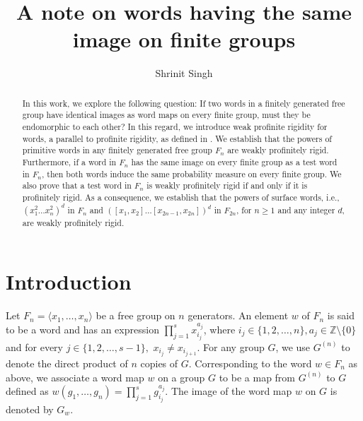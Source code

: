 \documentclass[12pt]{amsart}
\def \Z {{\mathbb{Z}}}
\begin{document}
\title{A note on words having the same image on finite groups}



\author{Shrinit Singh}
\address{Department of Mathematics, Shiv Nadar Institution of Eminence, Greater Noida, Dadri-201314, India }

 



\begin{abstract}
In this work, we explore the following question: If two words in a finitely generated free group have identical images as word maps on every finite group, must they be endomorphic to each other? In this regard, we introduce weak profinite rigidity for words, a parallel to profinite rigidity, as defined in \cite{hanany2020some}. We establish that the powers of primitive words in any finitely generated free group $F_n$ are weakly profinitely rigid. Furthermore, if a word in $F_n$ has the same image on every finite group as a test word in $F_n$, then both words induce the same probability measure on every finite group. We also prove that a test word in $F_n$ is weakly profinitely rigid if and only if it is profinitely rigid. As a consequence, we establish that the powers of surface words, i.e., $(x_1^2\ldots x_n^2)^d$ in $F_n$ and $([x_1,x_2]\ldots [x_{2n-1},x_{2n}])^d$ in $F_{2n}$, for $n \geq 1$ and any integer $d$, are weakly profinitely rigid.


\end{abstract}
\maketitle


\section{Introduction}

Let $F_n = \langle x_1, \ldots, x_n \rangle$ be a free group on $n$ generators. An element $w$ of $F_n$ is said to be a word and has an expression $\prod_{j=1}^s x_{i_j}^{a_j}$, where $i_j \in \{ 1,2, \ldots, n\}, a_j \in \Z\setminus \{0\}$ and for every $j \in \{1,2, \ldots, s-1\},$ $x_{i_j} \neq x_{i_{j+1}}.$ For any group $G$, we use $G^{(n)}$ to denote the direct product of $n$ copies of $G.$ Corresponding to the word $w \in F_n$ as above, we associate a word map $w$ on a group $G$ to be a map from $G^{(n)}$ to $G$ defined as $w(g_1,\ldots,g_n) = \prod_{j=1}^s g_{i_j}^{a_j}.$ The image of the word map $w$ on $G$ is denoted by $G_w.$
\end{document}
